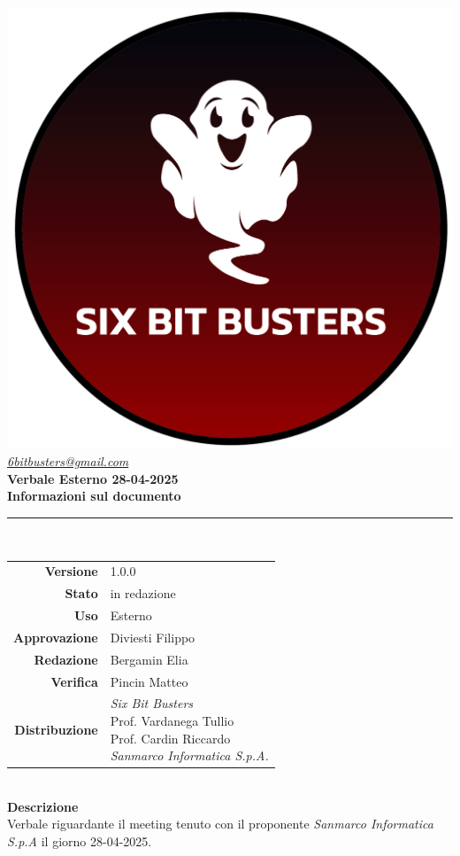 \thispagestyle{empty}
\renewcommand{\arraystretch}{1.3}


\begin{titlepage}
	\begin{center}
		
	\includegraphics[scale = 0.7]{template/images/logo-circle.png}
	\\[1cm]
	\href{mailto:6bitbusters@gmail.com}		      	
	{\large{\textit{6bitbusters@gmail.com} } }\\[1cm]
	
	\Huge \textbf{Verbale Esterno 28-04-2025} \\[1cm]

	\large \textbf{Informazioni sul documento} \\
	\rule{0.6\textwidth}{0.4pt}
	\\[0.5cm]
	\begin{tabular}{r|l}
		\textbf{Versione} & 1.0.0\\
		\textbf{Stato} & in redazione\\
		\textbf{Uso} & Esterno\\                         
		\textbf{Approvazione} & Diviesti Filippo\\                      
		\textbf{Redazione} & Bergamin Elia\\ 
		\textbf{Verifica} & Pincin Matteo\\                         
		\textbf{Distribuzione} & \parbox[t]{6cm}{ \textit{Six Bit Busters} \\ Prof. Vardanega Tullio 
	 \\ Prof. Cardin Riccardo \\ \textit{Sanmarco Informatica S.p.A.}} 
	\end{tabular}	
	\\[1.2cm]

	\large \textbf{Descrizione} \\
	Verbale riguardante il meeting tenuto con il proponente \textit{Sanmarco Informatica S.p.A} il giorno 28-04-2025.
	
	\end{center}
\end{titlepage}
